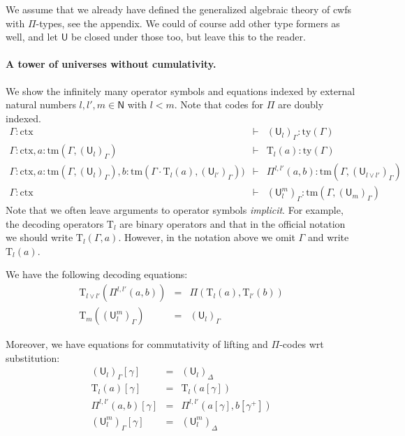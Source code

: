 \documentclass[11pt,a4paper]{article}
\theoremstyle{definition}
\newcommand{\NN}{\mathsf{N}}
\newcommand{\UU}{\mathsf{U}}
\def\NN{\mathsf{N}}
\def\UU{\mathsf{U}}
\newcommand{\N}{\mathsf{N}}
\def\Pihat{\Pi}
\newcommand{\ctx}{\mathrm{ctx}}
\newcommand{\ty}{\mathrm{ty}}
\newcommand{\tm}{\mathrm{tm}}
\def\U{\mathsf{U}}
\newcommand{\Ta}{\mathrm{T}}
\begin{document}
We assume that we already have defined the generalized algebraic theory of cwfs with $\Pi$-types, see the appendix. We could of course add other type formers as well, and let $\UU$ be closed under those too, but leave this to the reader. 

\paragraph{A tower of universes without cumulativity.} We show the infinitely many operator symbols and equations indexed by external natural numbers $l, l' , m \in \NN$ with $l < m$. Note that codes for $\Pi$ are doubly indexed.
\begin{eqnarray*}
\Gamma : \ctx &\vdash& (\U_{l})_\Gamma : \ty(\Gamma)\\
\Gamma : \ctx, a : \tm(\Gamma,(\U_{l})_\Gamma) &\vdash& {\Ta_{l}}(a) : \ty(\Gamma)\\
\Gamma : \ctx,
a : \tm(\Gamma,(\U_{l})_\Gamma),
b :  \tm(\Gamma \cdot \Ta_{l}(a), (\U_{l'})_\Gamma))
&\vdash&
 \Pihat^{l,l'}(a,b) : \tm(\Gamma,(\U_{l \vee l'})_\Gamma)\\
 \Gamma : \ctx&\vdash&(\UU^m_l)_\Gamma: \tm(\Gamma,(\UU_{m})_\Gamma)
\end{eqnarray*}
Note that we often leave arguments to operator symbols {\em implicit}. For example, the decoding operators $\Ta_l$ are binary operators and that in the official notation we should write $\Ta_l(\Gamma,a)$. However, in the notation above we omit $\Gamma$ and write $\Ta_l(a)$.

We have the following decoding equations:
\begin{eqnarray*}
\Ta_{l \vee l'}(\Pi^{l,l'}(a,b)) &=& \Pi(\Ta_l(a),\Ta_{l'}(b))\\
\Ta_{m}((\UU^m_l)_\Gamma) &=& (\UU_l)_\Gamma
\end{eqnarray*}

Moreover, we have equations for commutativity of lifting and $\Pi$-codes wrt substitution:
 \begin{eqnarray*}
(\U_l)_\Gamma [ \gamma ] &=& (\U_l)_\Delta\\
\Ta_l(a) [ \gamma ] &=& \Ta_l(a[ \gamma ] )\\
\Pi^{l,l'}(a,b)[ \gamma ] &=& \Pi^{l,l'}(a [ \gamma ], b[ \gamma^+ ])\\
(\UU^m_l)_\Gamma[ \gamma ] &=&(\UU^m_l)_\Delta
\end{eqnarray*}
\end{document}
